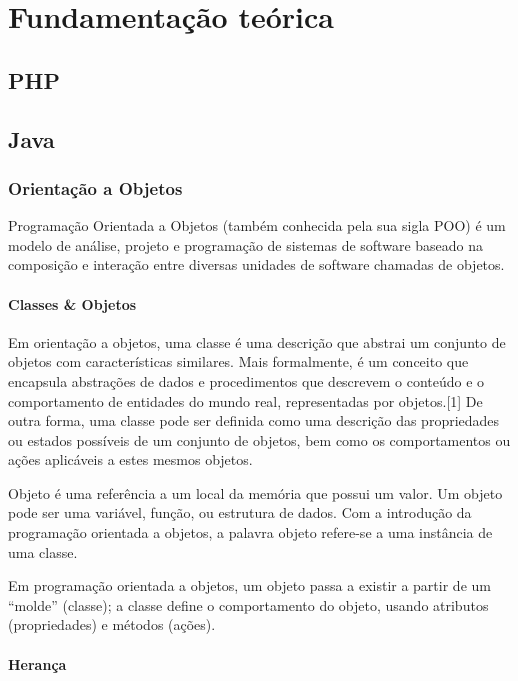\chapter{Fundamentação teórica}

\section{PHP}
\lipsum[1]
\lipsum[2-3]

\section{Java}
\lipsum[1]

\subsection{Orientação a Objetos}

Programação Orientada a Objetos (também conhecida pela sua sigla POO) é um modelo de análise, projeto e programação de sistemas de software baseado na composição e interação entre diversas unidades de software chamadas de objetos.

\lipsum[2-3]

\subsubsection{Classes \& Objetos}

Em orientação a objetos, uma classe é uma descrição que abstrai um conjunto de objetos com características similares. Mais formalmente, é um conceito que encapsula abstrações de dados e procedimentos que descrevem o conteúdo e o comportamento de entidades do mundo real, representadas por objetos.[1] De outra forma, uma classe pode ser definida como uma descrição das propriedades ou estados possíveis de um conjunto de objetos, bem como os comportamentos ou ações aplicáveis a estes mesmos objetos.

Objeto é uma referência a um local da memória que possui um valor. Um objeto pode ser uma variável, função, ou estrutura de dados. Com a introdução da programação orientada a objetos, a palavra objeto refere-se a uma instância de uma classe.

Em programação orientada a objetos, um objeto passa a existir a partir de um ``molde'' (classe); a classe define o comportamento do objeto, usando atributos (propriedades) e métodos (ações).

\subsubsection{Herança}

